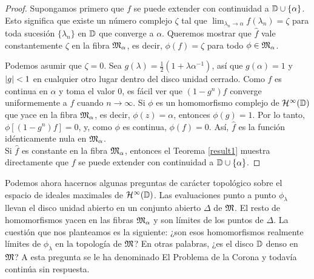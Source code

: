 \begin{proof}
    Supongamos primero que $f$ se puede extender con continuidad a $\mathbb{D} \cup \{ \alpha\}$. Esto significa que existe un número complejo $\zeta$ tal que $\lim_{\lambda_n \rightarrow \alpha} f(\lambda_n) = \zeta$ para toda sucesión $\{\lambda_n\}$ en $\mathbb{D}$ que converge a $\alpha$. Queremos mostrar que $\hat f$ vale constantemente $\zeta$ en la fibra $\mathfrak{M}_\alpha$, es decir, $\phi(f) = \zeta$ para todo $\phi \in \mathfrak{M}_\alpha$.

    Podemos asumir que $\zeta = 0$. Sea $g(\lambda) = \frac{1}{2} (1 + \lambda \alpha^{-1})$, así que $g(\alpha) = 1$ y $\left\lvert g\right\rvert < 1$ en cualquier otro lugar dentro del disco unidad cerrado. Como $f$ es continua en $\alpha$ y toma el valor $0$, es fácil ver que $(1 - g^n) f$ converge uniformemente a $f$ cuando $n \rightarrow \infty$. Si $\phi$ es un homomorfismo complejo de $\mathcal{H}^{\infty}(\mathbb{D})$ que yace en la fibra $\mathfrak{M}_\alpha$, es decir, $\phi (z) = \alpha$, entonces $\phi (g) = 1$. Por lo tanto, $\phi [(1 - g^n)f] = 0$, y, como $\phi$ es continua, $\phi (f) = 0$. Así, $\hat f$ es la función idénticamente nula en $\mathfrak{M}_\alpha$. \\


    Si $\hat f$ es constante en la fibra $\mathfrak{M}_\alpha$, entonces el Teorema \ref{result1} muestra directamente que $f$ se puede extender con continuidad a $\mathbb{D} \cup \{ \alpha \}$.

\end{proof}

\bigskip

Podemos ahora hacernos algunas preguntas de carácter topológico sobre el espacio de ideales maximales de $\mathcal{H}^{\infty}(\mathbb{D})$. Las evaluaciones punto a punto  $\phi_\lambda$ llevan el disco unidad abierto en un conjunto abierto $\Delta$ de $\mathfrak{M}$. El resto de homomorfismos yacen en las fibras $\mathfrak{M}_\alpha$ y son límites de los puntos de $\Delta$. La cuestión que nos planteamos es la siguiente: ¿son esos homomorfismos realmente límites de $\phi_\lambda$ en la
topología de $\mathfrak{M}$? En otras palabras, ¿es el disco $\mathbb{D}$ denso en $\mathfrak{M}$? A esta pregunta se le ha denominado El Problema de la Corona y todavía continúa sin respuesta.


